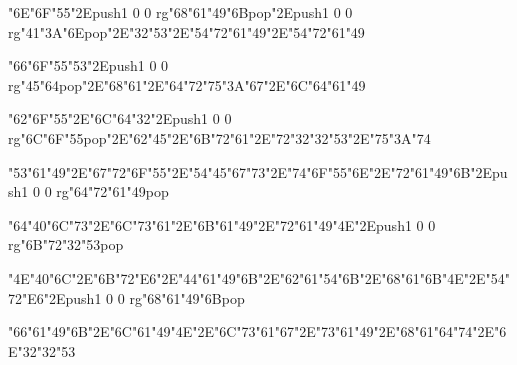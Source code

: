 \centerline{\ipa\char"6E\ipa\char"6F\ipa\char"55\ipa\char"2E\pdfcolorstack\match push{1 0 0 rg}\ipa\char"68\ipa\char"61\ipa\char"49\ipa\char"6B\pdfcolorstack\match pop{}\ipa\char"2E\pdfcolorstack\match push{1 0 0 rg}\ipa\char"41\ipa\char"3A\ipa\char"6E\pdfcolorstack\match pop{}\ipa\char"2E\ipa\char"32\ipa\char"53\ipa\char"2E\ipa\char"54\ipa\char"72\ipa\char"61\ipa\char"49\ipa\char"2E\ipa\char"54\ipa\char"72\ipa\char"61\ipa\char"49}
\vfill\eject
\null\vfill
\centerline{\ipa\char"66\ipa\char"6F\ipa\char"55\ipa\char"53\ipa\char"2E\pdfcolorstack\match push{1 0 0 rg}\ipa\char"45\ipa\char"64\pdfcolorstack\match pop{}\ipa\char"2E\ipa\char"68\ipa\char"61\ipa\char"2E\ipa\char"64\ipa\char"72\ipa\char"75\ipa\char"3A\ipa\char"67\ipa\char"2E\ipa\char"6C\ipa\char"64\ipa\char"61\ipa\char"49}\bigskip
\centerline{\ipa\char"62\ipa\char"6F\ipa\char"55\ipa\char"2E\ipa\char"6C\ipa\char"64\ipa\char"32\ipa\char"2E\pdfcolorstack\match push{1 0 0 rg}\ipa\char"6C\ipa\char"6F\ipa\char"55\pdfcolorstack\match pop{}\ipa\char"2E\ipa\char"62\ipa\char"45\ipa\char"2E\ipa\char"6B\ipa\char"72\ipa\char"61\ipa\char"2E\ipa\char"72\ipa\char"32\ipa\char"32\ipa\char"53\ipa\char"2E\ipa\char"75\ipa\char"3A\ipa\char"74}\bigskip
\centerline{\ipa\char"53\ipa\char"61\ipa\char"49\ipa\char"2E\ipa\char"67\ipa\char"72\ipa\char"6F\ipa\char"55\ipa\char"2E\ipa\char"54\ipa\char"45\ipa\char"67\ipa\char"73\ipa\char"2E\ipa\char"74\ipa\char"6F\ipa\char"55\ipa\char"6E\ipa\char"2E\ipa\char"72\ipa\char"61\ipa\char"49\ipa\char"6B\ipa\char"2E\pdfcolorstack\match push{1 0 0 rg}\ipa\char"64\ipa\char"72\ipa\char"61\ipa\char"49\pdfcolorstack\match pop{}}
\vfill\eject
\null\vfill
\centerline{\ipa\char"64\ipa\char"40\ipa\char"6C\ipa\char"73\ipa\char"2E\ipa\char"6C\ipa\char"73\ipa\char"61\ipa\char"2E\ipa\char"6B\ipa\char"61\ipa\char"49\ipa\char"2E\ipa\char"72\ipa\char"61\ipa\char"49\ipa\char"4E\ipa\char"2E\pdfcolorstack\match push{1 0 0 rg}\ipa\char"6B\ipa\char"72\ipa\char"32\ipa\char"53\pdfcolorstack\match pop{}}\bigskip
\centerline{\ipa\char"4E\ipa\char"40\ipa\char"6C\ipa\char"2E\ipa\char"6B\ipa\char"72\ipa\char"E6\ipa\char"2E\ipa\char"44\ipa\char"61\ipa\char"49\ipa\char"6B\ipa\char"2E\ipa\char"62\ipa\char"61\ipa\char"54\ipa\char"6B\ipa\char"2E\ipa\char"68\ipa\char"61\ipa\char"6B\ipa\char"4E\ipa\char"2E\ipa\char"54\ipa\char"72\ipa\char"E6\ipa\char"2E\pdfcolorstack\match push{1 0 0 rg}\ipa\char"68\ipa\char"61\ipa\char"49\ipa\char"6B\pdfcolorstack\match pop{}}\bigskip
\centerline{\ipa\char"66\ipa\char"61\ipa\char"49\ipa\char"6B\ipa\char"2E\ipa\char"6C\ipa\char"61\ipa\char"49\ipa\char"4E\ipa\char"2E\ipa\char"6C\ipa\char"73\ipa\char"61\ipa\char"67\ipa\char"2E\ipa\char"73\ipa\char"61\ipa\char"49\ipa\char"2E\ipa\char"68\ipa\char"61\ipa\char"64\ipa\char"74\ipa\char"2E\ipa\char"6E\ipa\char"32\ipa\char"32\ipa\char"53}
